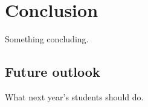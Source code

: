 \chapter{Conclusion\label{cha: conclusion}}

Something concluding.

\section{Future outlook}

What next year's students should do.